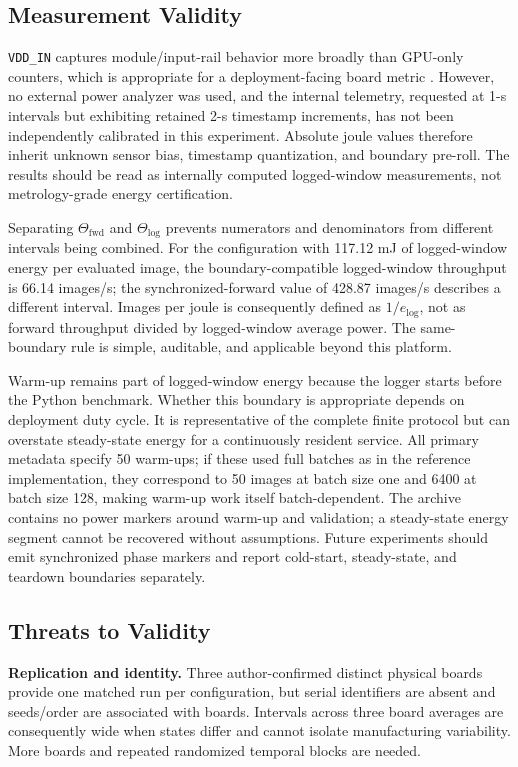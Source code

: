 \documentclass[electronics,article,submit,pdftex,moreauthors]{Definitions/mdpi}
\newcommand{\fwd}{\mathrm{fwd}}
\newcommand{\logwin}{\mathrm{log}}
\begin{document}
\subsection{Measurement Validity}

\texttt{VDD\_IN} captures module/input-rail behavior more broadly than GPU-only counters, which is appropriate for a deployment-facing board metric \cite{nvidiategrastats}. However, no external power analyzer was used, and the internal telemetry, requested at 1-s intervals but exhibiting retained 2-s timestamp increments, has not been independently calibrated in this experiment. Absolute joule values therefore inherit unknown sensor bias, timestamp quantization, and boundary pre-roll. The results should be read as internally computed logged-window measurements, not metrology-grade energy certification.

Separating $\Theta_{\fwd}$ and $\Theta_{\logwin}$ prevents numerators and denominators from different intervals being combined. For the configuration with 117.12 mJ of logged-window energy per evaluated image, the boundary-compatible logged-window throughput is 66.14 images/s; the synchronized-forward value of 428.87 images/s describes a different interval. Images per joule is consequently defined as $1/e_{\logwin}$, not as forward throughput divided by logged-window average power. The same-boundary rule is simple, auditable, and applicable beyond this platform.

Warm-up remains part of logged-window energy because the logger starts before the Python benchmark. Whether this boundary is appropriate depends on deployment duty cycle. It is representative of the complete finite protocol but can overstate steady-state energy for a continuously resident service. All primary metadata specify 50 warm-ups; if these used full batches as in the reference implementation, they correspond to 50 images at batch size one and 6400 at batch size 128, making warm-up work itself batch-dependent. The archive contains no power markers around warm-up and validation; a steady-state energy segment cannot be recovered without assumptions. Future experiments should emit synchronized phase markers and report cold-start, steady-state, and teardown boundaries separately.

\subsection{Threats to Validity}

\textbf{Replication and identity.} Three author-confirmed distinct physical boards provide one matched run per configuration, but serial identifiers are absent and seeds/order are associated with boards. Intervals across three board averages are consequently wide when states differ and cannot isolate manufacturing variability. More boards and repeated randomized temporal blocks are needed.
\end{document}
